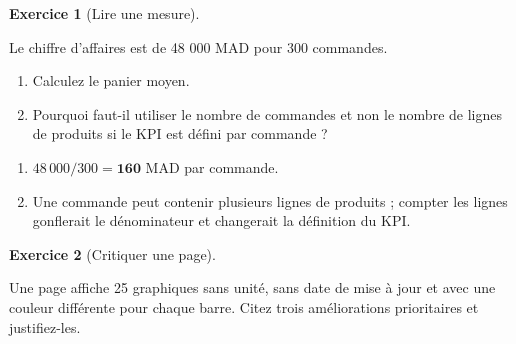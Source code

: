 \documentclass[
  french,
  letterpaper,
  open=any]{scrbook}
\providecommand{\tightlist}{%
  \setlength{\itemsep}{0pt}\setlength{\parskip}{0pt}}
\theoremstyle{definition}
\theoremstyle{definition}
\newtheorem{exercise}{Exercice}[section]
\theoremstyle{remark}
\begin{document}
\begin{exercise}[Lire une
mesure]\protect\hypertarget{exr-bi-7}{}\label{exr-bi-7}

Le chiffre d'affaires est de 48 000 MAD pour 300 commandes.

\begin{enumerate}
\def\labelenumi{\alph{enumi}.}
\tightlist
\item
  Calculez le panier moyen.
\item
  Pourquoi faut-il utiliser le nombre de commandes et non le nombre de
  lignes de produits si le KPI est défini par commande ?
\end{enumerate}

\end{exercise}

\begin{tcolorbox}[enhanced jigsaw, arc=.35mm, bottomrule=.15mm, bottomtitle=1mm, breakable, colback=white, colbacktitle=quarto-callout-tip-color!10!white, colframe=quarto-callout-tip-color-frame, coltitle=black, left=2mm, leftrule=.75mm, opacityback=0, opacitybacktitle=0.6, rightrule=.15mm, title=\textcolor{quarto-callout-tip-color}{\faLightbulb}\hspace{0.5em}{Solution de l'exercice Exercice~\ref{exr-bi-7}}, titlerule=0mm, toprule=.15mm, toptitle=1mm]

\begin{enumerate}
\def\labelenumi{\alph{enumi}.}
\tightlist
\item
  \(48\,000/300=\textbf{160}\) MAD par commande.
\item
  Une commande peut contenir plusieurs lignes de produits ; compter les
  lignes gonflerait le dénominateur et changerait la définition du KPI.
\end{enumerate}

\end{tcolorbox}

\begin{exercise}[Critiquer une
page]\protect\hypertarget{exr-bi-8}{}\label{exr-bi-8}

Une page affiche 25 graphiques sans unité, sans date de mise à jour et
avec une couleur différente pour chaque barre. Citez trois améliorations
prioritaires et justifiez-les.

\end{exercise}
\end{document}

